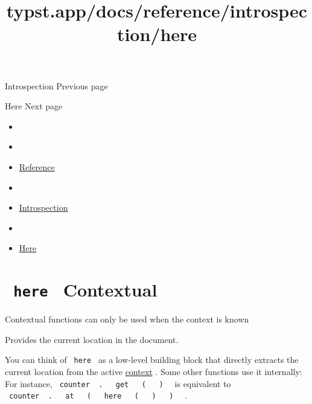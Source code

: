 \href{/docs/reference/introspection/}{\pandocbounded{}}

{ Introspection } { Previous page }

\href{/docs/reference/introspection/here/}{\pandocbounded{}}

{ Here } { Next page }


\title{typst.app/docs/reference/introspection/here}

\begin{itemize}
\tightlist
\item
  \href{/docs}{}
\item
  
\item
  \href{/docs/reference/}{Reference}
\item
  
\item
  \href{/docs/reference/introspection/}{Introspection}
\item
  
\item
  \href{/docs/reference/introspection/here/}{Here}
\end{itemize}

\section{\texorpdfstring{\texttt{\ here\ } {{ Contextual
}}}{ here   Contextual }}\label{summary}

\label{contextual-tooltip}
Contextual functions can only be used when the context is known

Provides the current location in the document.

You can think of \texttt{\ here\ } as a low-level building block that
directly extracts the current location from the active
\href{/docs/reference/context/}{context} . Some other functions use it
internally: For instance,
\texttt{\ counter\ }{\texttt{\ .\ }}\texttt{\ }{\texttt{\ get\ }}\texttt{\ }{\texttt{\ (\ }}\texttt{\ }{\texttt{\ )\ }}\texttt{\ }
is equivalent to
\texttt{\ counter\ }{\texttt{\ .\ }}\texttt{\ }{\texttt{\ at\ }}\texttt{\ }{\texttt{\ (\ }}\texttt{\ }{\texttt{\ here\ }}\texttt{\ }{\texttt{\ (\ }}\texttt{\ }{\texttt{\ )\ }}\texttt{\ }{\texttt{\ )\ }}\texttt{\ }
.

